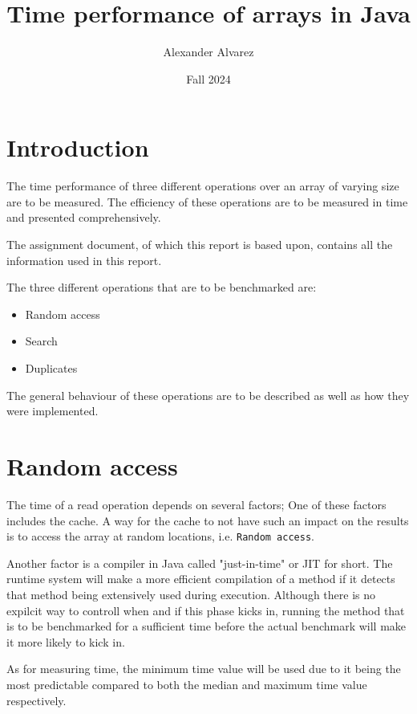 \documentclass[a4paper,11pt]{article}
\begin{document}
\title{
  \textbf{Time performance of arrays in Java}
}
\author{Alexander Alvarez}
\date{Fall 2024}

\maketitle

\section*{Introduction}

The time performance of three different operations over an array of 
varying size are to be measured. The efficiency of these operations are 
to be measured in time and presented comprehensively.

The assignment document, of which this report is based upon, contains
all the information used in this report.

The three different operations that are to be benchmarked are:

\begin{itemize}
  \item Random access
  
  \item Search
  
  \item Duplicates
\end{itemize}

The general behaviour of these operations are to be described as well
as how they were implemented.

\section*{Random access}

The time of a read operation depends on several factors; One of these 
factors includes the cache. A way for the cache to not have such an 
impact on the results is to access the array at random locations, i.e.
{\tt Random access}.

Another factor is a compiler in Java called "just-in-time" or JIT for
short. The runtime system will make a more efficient compilation of a
method if it detects that method being extensively used during 
execution. Although there is no expilcit way to controll when and if
this phase kicks in, running the method that is to be benchmarked for a
sufficient time before the actual benchmark will make it more likely
to kick in.

As for measuring time, the minimum time value will be used due to it
being the most predictable compared to both the median and maximum time
value respectively.
\end{document}
